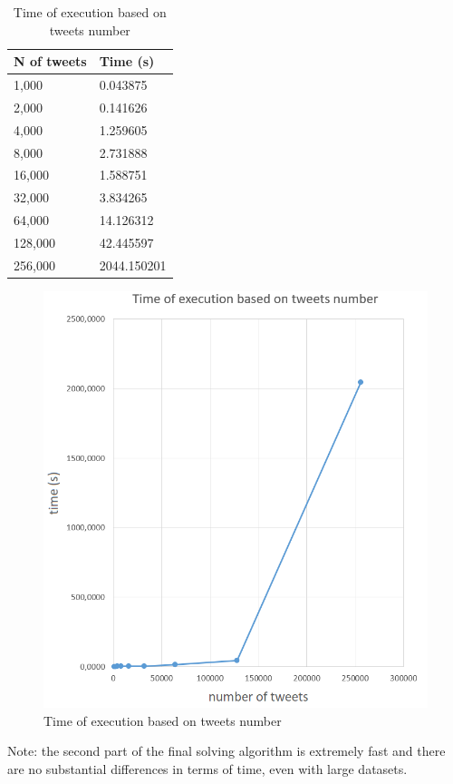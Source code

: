  
\begin{table}[h]
  \centering
  \begin{tabular}{@{}ll@{}}
  \toprule
  \textbf{N of tweets}   & \textbf{Time (s)}                                         \\ \midrule
  1,000                  & 0.043875 \\
  2,000                  & 0.141626 \\
  4,000                  & 1.259605 \\
  8,000                  & 2.731888 \\
  16,000                 & 1.588751 \\
  32,000                 & 3.834265 \\
  64,000                 & 14.126312 \\
  128,000                & 42.445597 \\
  256,000                & 2044.150201 \\ \bottomrule
  \end{tabular}
  \caption{Time of execution based on tweets number}
  \label{tab_apriori_sc}
\end{table}

\begin{figure}[h]
  \includegraphics[scale=0.415]{scalability.png}
  \centering
  \caption{Time of execution based on tweets number}
  \label{fig_times}
\end{figure}

Note: the second part of the final solving algorithm is extremely fast and there are no substantial differences in terms of time, even with large datasets.

